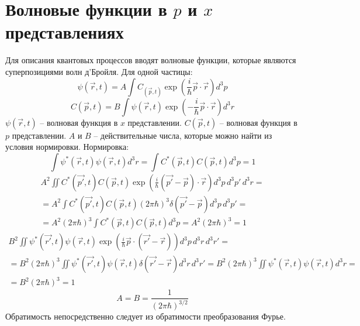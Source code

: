 \section{Волновые функции в $p$ и $x$ представлениях}

Для описания квантовых процессов вводят волновые функции, которые являются суперпозициями волн д'Бройля. Для одной частицы:
\[
	\psi(\vec{r}, t) = A \int C_(\vec{p}, t) \exp \left(\frac{i}{\hbar} \vec{p} \cdot \vec{r}\right) d^3p
\]
\[
	C(\vec{p}, t) = B \int \psi(\vec{r}, t) \exp \left(-\frac{i}{\hbar} \vec{p} \cdot \vec{r}\right) d^3r
\]
$\psi(\vec{r}, t)$ -- волновая функция в $x$ представлении. $C(\vec{p}, t)$ -- волновая функция в $p$ представлении. $A$ и $B$ -- действительные числа, которые можно найти из условия нормировки. Нормировка:
\[
	\int \psi^*(\vec{r}, t) \psi(\vec{r}, t) d^3r = \int C^*(\vec{p}, t) C(\vec{p}, t) d^3p = 1
\]
\[
	\begin{gathered}
		A^2\iint C^*(\vec{p'}, t) C(\vec{p}, t) \exp \left(\frac{i}{\hbar} (\vec{p'} - \vec{p}) \cdot \vec{r}\right) d^3p\, d^3p'\, d^3r 
		= \\
		=
		A^2\int C^*(\vec{p'}, t) C(\vec{p}, t) (2\pi \hbar)^3 \delta(\vec{p'} - \vec{p}) d^3p\, d^3p'
		= \\
		=
		A^2 (2\pi \hbar)^3 \int C^*(\vec{p}, t) C(\vec{p}, t) d^3p = A^2 (2\pi \hbar)^3 = 1
	\end{gathered}
\]
\[
	\begin{gathered}
		B^2\iint \psi^*(\vec{r'}, t) \psi(\vec{r}, t) \exp \left(\frac{i}{\hbar} \vec{p} \cdot (\vec{r'} - \vec{r})\right) d^3p \, d^3r \, d^3r'
		= \\
		=
		B^2 (2\pi\hbar)^3 \iint \psi^*(\vec{r'}, t) \psi(\vec{r}, t) \delta(\vec{r'} - \vec{r}) d^3r \, d^3r' = B^2 (2\pi\hbar)^3 \iint \psi^*(\vec{r}, t) \psi(\vec{r}, t) d^3r 
		= \\
		=
		B^2 (2\pi\hbar)^3 = 1
	\end{gathered}
\]
\[
	A = B =\frac{1}{(2\pi\hbar)^{3/2}}
\]
Обратимость непосредственно следует из обратимости преобразования Фурье.

